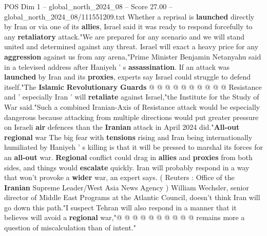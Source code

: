 \begin{textsample}{POS Dim 1 – global\_north\_2024\_08 – Score 27.00 – global\_north\_2024\_08/111551209.txt}
Whether a reprisal is \textbf{launched} directly by Iran or via one of its \textbf{allies}, Israel said it was ready to respond forcefully to any \textbf{retaliatory} attack."We are prepared for any scenario and we will stand united and determined against any threat.
Israel will exact a heavy price for any \textbf{aggression} against us from any arena,"Prime Minister Benjamin Netanyahu said in a televised address after Haniyeh ' s \textbf{assassination}.
If an attack was \textbf{launched} by Iran and its \textbf{proxies}, experts say Israel could struggle to defend itself."The \textbf{Islamic} \textbf{Revolutionary} \textbf{Guards} @ @ @ @ @ @ @ @ @ @ Resistance and ' especially Iran ' will \textbf{retaliate} against Israel,"the Institute for the Study of War said."Such a combined Iranian-Axis of Resistance attack would be especially dangerous because attacking from multiple directions would put greater pressure on Israeli \textbf{air} defences than the \textbf{Iranian} attack in April 2024 did."\textbf{All-out} \textbf{regional} war The big fear with \textbf{tensions} rising and Iran being internationally humiliated by Haniyeh ' s killing is that it will be pressed to marshal its forces for an \textbf{all-out} war. \textbf{Regional} conflict could drag in \textbf{allies} and \textbf{proxies} from both sides, and things would \textbf{escalate} quickly.
Iran will probably respond in a way that won't provoke a \textbf{wider} war, an expert says. ( Reuters : Office of the \textbf{Iranian} Supreme Leader/West Asia News Agency ) William Wechsler, senior director of Middle East Programs at the Atlantic Council, doesn't think Iran will go down this path."I suspect Tehran will also respond in a manner that it believes will avoid a \textbf{regional} war,"@ @ @ @ @ @ @ @ @ @ remains more a question of miscalculation than of intent."

\end{textsample}
